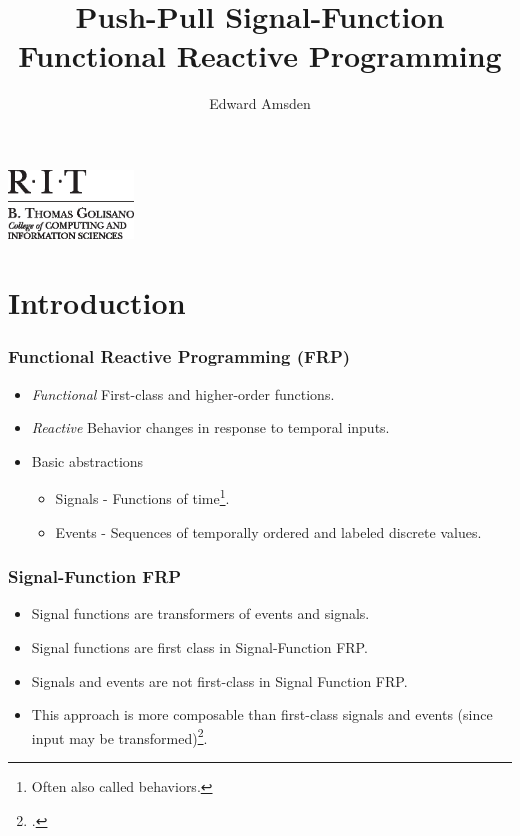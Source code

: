 \documentclass{beamer}
\title{Push-Pull Signal-Function Functional Reactive Programming}
\author{Edward Amsden}
\institute{Rochester Institute of Technology}
\begin{document}
\AtBeginSection[]
{
\begin{frame}
\frametitle{\insertsection}
\end{frame}
}

\begin{frame}[plain]
\titlepage
\includegraphics[width=9em]{RIT_GCCIS1}
\end{frame}


\section{Introduction}

\begin{frame}
\frametitle{Functional Reactive Programming (FRP)}
    \begin{itemize}
        \item {\em Functional} First-class and higher-order functions.
        \item {\em Reactive} Behavior changes in response to temporal inputs.
        \item Basic abstractions
        \begin{itemize}
            \item Signals - Functions of time\footnote{Often also called behaviors.}.
            \item Events - Sequences of temporally ordered and labeled discrete values.
        \end{itemize}
    \end{itemize}
\end{frame}

\begin{frame}
\frametitle{Signal-Function FRP}
    \begin{itemize}
        \item Signal functions are transformers of events and signals.
        \item Signal functions are first class in Signal-Function FRP.
        \item Signals and events are not first-class in Signal Function FRP.
        \item This approach is more composable than first-class signals and events (since input may be transformed)\footcite{Courtney2001-1}.
    \end{itemize}
\end{frame}
\end{document}
